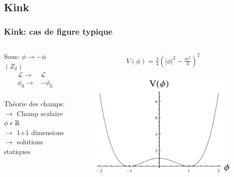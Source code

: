 \documentclass[handout]{beamer}
\begin{document}
\subsection{Kink}
\begin{frame}\frametitle{Kink: cas de figure typique}
\begin{columns}[T]
    \begin{column}[T]{.5\linewidth}
    \begin{exampleblock}{Sous: $\phi \rightarrow -\phi$ $(Z_2)$}
    \begin{align*}
    \mathcal{L} \rightarrow& \mathcal{L}\\
    \phi_0 \rightarrow& -\phi_0 \\
    \end{align*}    
    \end{exampleblock}
    Théorie des champs:
\\$\rightarrow$ Champ scalaire $\phi \hspace{1mm} \epsilon \hspace{1mm} \mathbb{R}$
    \\$\rightarrow$ 1+1 dimensions
  \\$\rightarrow$ solutions statiques \\[0.5 cm]
\end{column}
    \begin{column}[T]{.5\linewidth}
    \begin{block}{}
    \begin{align*}
      V(\phi) = \frac{\lambda}{4}(|\phi|^2 -\frac{m^2}{\lambda})^2
\end{align*}      
      \end{block}
    \begin{figure}
     \includegraphics[scale=0.4]{pot_z2.png}
    \end{figure}
    \end{column}
\end{columns}
\end{frame}
\end{document}
